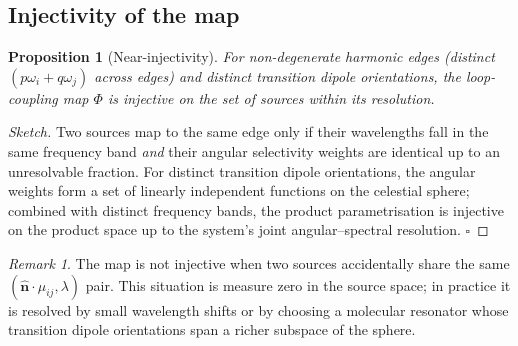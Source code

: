 \documentclass[11pt,twocolumn,a4paper]{article}
\newtheorem{proposition}[theorem]{Proposition}
\theoremstyle{definition}
\theoremstyle{remark}
\newtheorem{remark}[theorem]{Remark}
\begin{document}
\subsection{Injectivity of the map}

\begin{proposition}[Near-injectivity]
\label{prop:injectivity}
For non-degenerate harmonic edges (distinct $(p\omega_i + q\omega_j)$ across edges) and distinct transition dipole orientations, the loop-coupling map $\Phi$ is injective on the set of sources within its resolution.
\end{proposition}

\begin{proof}[Sketch]
Two sources map to the same edge only if their wavelengths fall in the same frequency band \emph{and} their angular selectivity weights are identical up to an unresolvable fraction. For distinct transition dipole orientations, the angular weights form a set of linearly independent functions on the celestial sphere; combined with distinct frequency bands, the product parametrisation is injective on the product space up to the system's joint angular--spectral resolution. $\square$
\end{proof}

\begin{remark}
The map is not injective when two sources accidentally share the same $(\hat{\mathbf{n}} \cdot \mu_{ij}, \lambda)$ pair. This situation is measure zero in the source space; in practice it is resolved by small wavelength shifts or by choosing a molecular resonator whose transition dipole orientations span a richer subspace of the sphere.
\end{remark}
\end{document}
